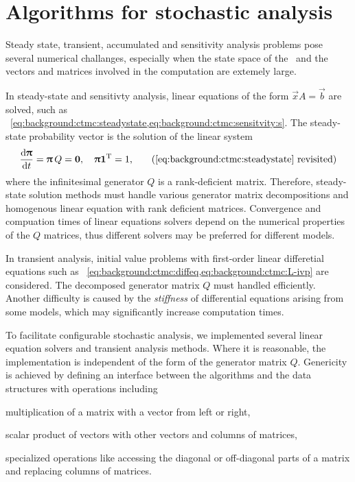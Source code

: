\chapter{Algorithms for stochastic analysis}
\label{chap:algorithms}

Steady state, transient, accumulated and sensitivity analysis problems
pose several numerical challanges, especially when the state space of
the \CTMC\ and the vectors and matrices involved in the computation are
extemely large.

In steady-state and sensitivty analysis, linear equations of the form
$\vec{x} A = \vec{b}$ are solved, such as%
~\vref{eq:background:ctmc:steadystate,eq:background:ctmc:sensitvity:s}. The
steady-state probability vector is the solution of the linear system
\begin{equation}
  \frac{\dd \vec{\uppi}}{\dd t} = \vec{\uppi} \, Q = \vec{0},
  \quad \vec{\uppi} \vec{1}^\T = 1 \text,
  \tag{\ref{eq:background:ctmc:steadystate}~revisited}
\end{equation}
where the infinitesimal generator $Q$ is a rank-deficient
matrix. Therefore, steady-state solution methods must handle various
generator matrix decompositions and homogenous linear equation with
rank deficient matrices. Convergence and compuation times of linear
equations solvers depend on the numerical properties of the $Q$
matrices, thus different solvers may be preferred for different
models.

In transient analysis, initial value problems with first-order linear
differetial equations such as%
~\vref{eq:background:ctmc:diffeq,eq:background:ctmc:L-ivp} are
considered. The decomposed generator matrix $Q$ must handled
efficiently. Another difficulty is caused by the \emph{stiffness} of
differential equations arising from some models, which may
significantly increase computation times.

To facilitate configurable stochastic analysis, we implemented several
linear equation solvers and transient analysis methods. Where it is
reasonable, the implementation is independent of the form of the
generator matrix $Q$. Genericity is achieved by defining an interface
between the algorithms and the data structures with operations including
\begin{asparaitem}
\item multiplication of a matrix with a vector from left or right,
\item scalar product of vectors with other vectors and columns of
  matrices,
\item specialized operations like accessing the diagonal or
  off-diagonal parts of a matrix and replacing columns of matrices.
\end{asparaitem}

